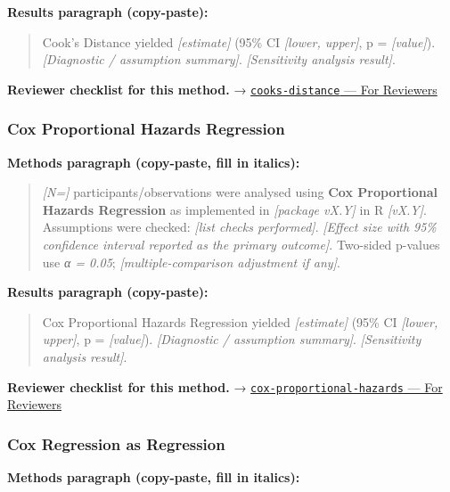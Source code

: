 \documentclass[
]{article}
\begin{document}
\textbf{Results paragraph (copy-paste):}

\begin{quote}
Cook's Distance yielded \emph{{[}estimate{]}} (95\% CI \emph{{[}lower,
upper{]}}, p = \emph{{[}value{]}}). \emph{{[}Diagnostic / assumption
summary{]}}. \emph{{[}Sensitivity analysis result{]}}.
\end{quote}

\textbf{Reviewer checklist for this method.} →
\href{../chapters/07-regression/cooks-distance.Rmd\#for-reviewers}{\texttt{cooks-distance}
--- For Reviewers}

\subsubsection{Cox Proportional Hazards
Regression}\label{cox-proportional-hazards-regression}

\textbf{Methods paragraph (copy-paste, fill in italics):}

\begin{quote}
\emph{{[}N={]}} participants/observations were analysed using
\textbf{Cox Proportional Hazards Regression} as implemented in
\emph{{[}package vX.Y{]}} in R \emph{{[}vX.Y{]}}. Assumptions were
checked: \emph{{[}list checks performed{]}}. \emph{{[}Effect size with
95\% confidence interval reported as the primary outcome{]}}. Two-sided
p-values use \emph{α = 0.05}; \emph{{[}multiple-comparison adjustment if
any{]}}.
\end{quote}

\textbf{Results paragraph (copy-paste):}

\begin{quote}
Cox Proportional Hazards Regression yielded \emph{{[}estimate{]}} (95\%
CI \emph{{[}lower, upper{]}}, p = \emph{{[}value{]}}).
\emph{{[}Diagnostic / assumption summary{]}}. \emph{{[}Sensitivity
analysis result{]}}.
\end{quote}

\textbf{Reviewer checklist for this method.} →
\href{../chapters/11-survival/cox-proportional-hazards.Rmd\#for-reviewers}{\texttt{cox-proportional-hazards}
--- For Reviewers}

\subsubsection{Cox Regression as
Regression}\label{cox-regression-as-regression}

\textbf{Methods paragraph (copy-paste, fill in italics):}
\end{document}
